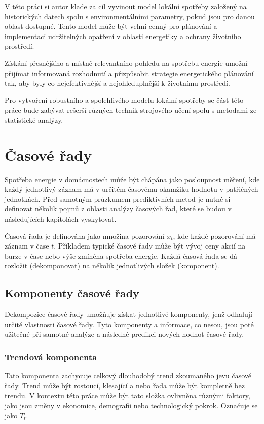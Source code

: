 \documentclass[FM,BP,fonts]{tulthesis}
\begin{document}
V této práci si autor klade za cíl vyvinout model lokální spotřeby založený na historických datech spolu s environmentálními parametry, pokud jsou pro danou
oblast dostupné. Tento model může být velmi cenný pro plánování a implementaci udržitelných opatření v oblasti energetiky a ochrany životního prostředí. 

Získání přesnějšího a místně relevantního pohledu na spotřebu energie umožní přijímat informovaná rozhodnutí a přizpůsobit strategie energetického plánování tak, aby byly co nejefektivnější a nejohleduplnější k životnímu prostředí.

Pro vytvoření robustního a spolehlivého modelu lokální spotřeby se část této práce bude zabývat rešerší různých technik strojového učení spolu s metodami
ze statistické analýzy.


\chapter{Časové řady}
Spotřeba energie v domácnostech může být chápána jako posloupnost měření, kde každý jednotlivý záznam má v určitém časovému okamžiku hodnotu v patřičných jednotkách. Před samotným průzkumem prediktivních metod je nutné si definovat několik pojmů z oblasti analýzy časových řad, které se budou v následujících kapitolách vyskytovat.

Časová řada je definována jako množina pozorování $x_t$, kde každé pozorování má záznam v čase $t$. \cite{Brockwell2016-qt} Příkladem typické časové řady může být vývoj ceny akcií na burze v čase nebo výše zmíněna spotřeba energie. Každá časová řada se dá rozložit (dekomponovat) na několik jednotlivých složek (komponent). 


\section{Komponenty časové řady}
Dekompozice časové řady umožňuje získat jednotlivé komponenty, jenž odhalují určité vlastnosti časové řady. Tyto komponenty a informace, co nesou, jsou poté užitečné při samotné analýze a následné predikci nových hodnot časové řady.

\subsection{Trendová komponenta}
Tato komponenta zachycuje celkový dlouhodobý trend zkoumaného jevu časové řady. Trend může být rostoucí, klesající a nebo řada může být kompletně bez trendu. V kontextu této práce může být tato složka ovlivněna různými faktory, jako jsou změny v ekonomice, demografii nebo technologický pokrok. Označuje se jako $T_t$.
\end{document}
